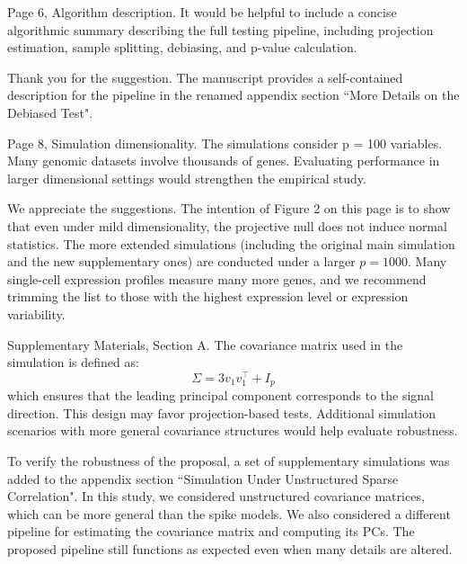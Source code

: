 \documentclass{article}
\theoremstyle{definition}
\begin{document}
\begin{shaded}
Page 6, Algorithm description.
It would be helpful to include a concise algorithmic summary describing the full testing pipeline, including projection estimation, sample splitting, debiasing, and p-value calculation.
\end{shaded}

Thank you for the suggestion. The manuscript provides a self-contained description for the pipeline in the renamed appendix section ``More Details on the Debiased Test".

\begin{shaded}
Page 8, Simulation dimensionality.
The simulations consider p = 100 variables. Many genomic datasets involve thousands of genes. Evaluating performance in larger dimensional settings would strengthen the empirical study.
\end{shaded}

We appreciate the suggestions. The intention of Figure 2 on this page is to show that even under mild dimensionality, the projective null does not induce normal statistics. The more extended simulations (including the original main simulation and the new supplementary ones) are conducted under a larger $p = 1000$. Many single-cell expression profiles measure many more genes, and we recommend trimming the list to those with the highest expression level or expression variability. 

\begin{shaded}
Supplementary Materials, Section A.
The covariance matrix used in the simulation is defined as:
$$
\Sigma = 3v_1 v_1^\top + I_p
$$
which ensures that the leading principal component corresponds to the signal direction. This design may favor projection-based tests. Additional simulation scenarios with more general covariance structures would help evaluate robustness.  
\end{shaded}

To verify the robustness of the proposal, a set of supplementary simulations was added to the appendix section ``Simulation Under Unstructured Sparse Correlation". In this study, we considered unstructured covariance matrices, which can be more general than the spike models. We also considered a different pipeline for estimating the covariance matrix and computing its PCs. The proposed pipeline still functions as expected even when many details are altered.



\end{document}
